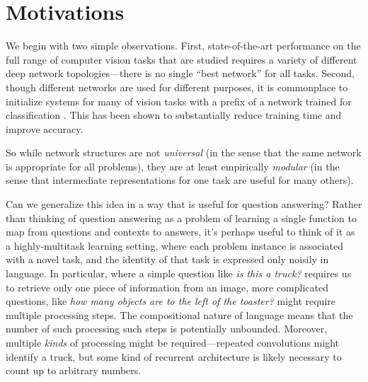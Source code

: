 \section{Motivations}

%
We begin with two simple observations. First, state-of-the-art performance on
the full range of computer vision tasks that are studied requires a variety of
different deep network topologies---there is no single ``best network'' for all
tasks. Second, though different networks are used for different purposes, it is
commonplace to initialize systems for many of vision tasks with a prefix of a
network trained for classification \cite{Girshick14RCNN}.  This has been shown
to substantially reduce training time and improve accuracy. 

So while network structures are not \emph{universal} (in the sense that the same
network is appropriate for all problems), they are at least empirically
\emph{modular} (in the sense that intermediate representations for one task are
useful for many others). 

Can we generalize this idea in a way that is useful for question answering?
Rather than thinking of question answering as a problem of learning a single
function to map from questions and contexts to answers, it's perhaps useful to
think of it as a highly-multitask learning setting, where each problem instance
is associated with a novel task, and the identity of that task is expressed only
noisily in language. In particular, where a simple question like \emph{is this a
truck?} requires us to retrieve only one piece of information from an image,
more complicated questions, like \emph{how many objects are to the left of
the toaster?} might require multiple processing steps. The compositional nature
of language means that the number of such processing such steps is
potentially unbounded. Moreover, multiple \emph{kinds} of processing might be
required---repeated convolutions might identify a truck, but some kind of
recurrent architecture is likely necessary to count up to arbitrary numbers.

